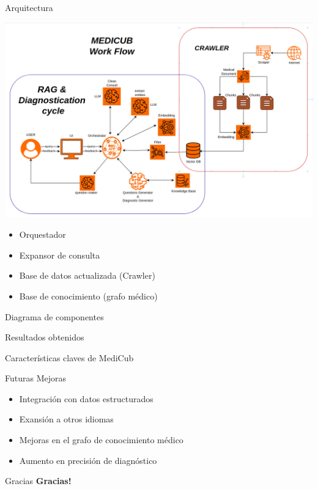 \documentclass[10pt]{beamer}
\begin{document}
\begin{frame}{Arquitectura}
  \begin{center}
    \includegraphics[scale=0.18]{Work Flow.png}
  \end{center}
  
  \begin{itemize}
    \item Orquestador
    \item Expansor de consulta
    \item Base de datos actualizada (Crawler)  
    \item Base de conocimiento (grafo médico)
  \end{itemize}

\end{frame}

\begin{frame}{Diagrama de componentes}
    
\end{frame}

\begin{frame}{Resultados obtenidos}
    
\end{frame}

\begin{frame}{Características claves de MediCub}
    
\end{frame}

\begin{frame}{Futuras Mejoras}
    \begin{itemize}
        \item Integración con datos estructurados
        \item Exansión a otros idiomas
        \item Mejoras en el grafo de conocimiento médico
        \item Aumento en precisión de diagnóstico
    \end{itemize}
\end{frame}

\begin{frame}{Gracias}
    \centering
    \LARGE\textbf{Gracias!} \\
\end{frame}
\end{document}
